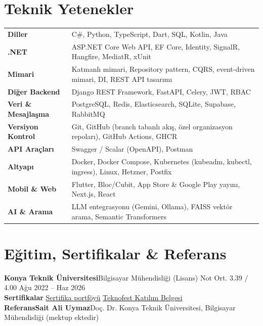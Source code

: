 \documentclass[10pt,a4paper]{extarticle}
\newcommand{\sep}{\;\textperiodcentered\;}
\begin{document}
\section{Teknik Yetenekler}
\renewcommand{\arraystretch}{1.05}
\noindent\begin{tabular}{@{}>{\raggedright\arraybackslash}p{}@{}>{\raggedright\arraybackslash}p{}@{}}
\textbf{Diller} & C\#, Python, TypeScript, Dart, SQL, Kotlin, Java\\
\textbf{.NET} & ASP.NET Core Web API, EF Core, Identity, SignalR, Hangfire, MediatR, xUnit\\
\textbf{Mimari} & Katmanlı mimari, Repository pattern, CQRS, event-driven mimari, DI, REST API tasarımı\\
\textbf{Diğer Backend} & Django REST Framework, FastAPI, Celery, JWT, RBAC\\
\textbf{Veri \& Mesajlaşma} & PostgreSQL, Redis, Elasticsearch, SQLite, Supabase, RabbitMQ\\
\textbf{Versiyon Kontrol} & Git, GitHub (branch tabanlı akış, özel organizasyon repoları), GitHub Actions, GHCR\\
\textbf{API Araçları} & Swagger / Scalar (OpenAPI), Postman\\
\textbf{Altyapı} & Docker, Docker Compose, Kubernetes (kubeadm, kubectl, ingress), Linux, Hetzner, Postfix\\
\textbf{Mobil \& Web} & Flutter, Bloc/Cubit, App Store \& Google Play yayını, Next.js, React\\
\textbf{AI \& Arama} & LLM entegrasyonu (Gemini, Ollama), FAISS vektör arama, Semantic Transformers\\
\end{tabular}

\section{Eğitim, Sertifikalar \& Referans}
\noindent\textbf{Konya Teknik Üniversitesi}\sep Bilgisayar Mühendisliği (Lisans) {\color{muted}\sep Not Ort. 3.39 / 4.00}
\hfill {\color{muted}Ağu 2022 -- Haz 2026}\\[3pt]
\noindent\textbf{Sertifikalar}\quad
\href{https://drive.google.com/file/d/1btYql9fKCvBwqHeh06F_NE257FhceNCB/view}{Sertifika portföyü}\sep
\href{https://drive.google.com/file/d/12AcWLnSGEfcZUWUb945n6nD-iPB7aIA9/view?usp=sharing}{Teknofest Katılım Belgesi}\\[3pt]
\noindent\textbf{Referans}\quad\textbf{Sait Ali Uymaz}\sep Doç. Dr. {\color{muted}\sep Konya Teknik Üniversitesi, Bilgisayar Mühendisliği}\sep
{\color{muted}(mektup ektedir)}
\end{document}
